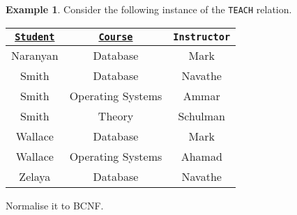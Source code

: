 \documentclass[a4paper, openany]{memoir}
\theoremstyle{definition}
\newtheorem{example}[subsection]{Example}
\begin{document}
    \begin{example}
        Consider the following instance of the \texttt{TEACH} relation.
        \begin{table}[H]
            \centering
            \begin{tabular}{|c|c|c|}
                \hline
                \texttt{\underline{Student}} & \texttt{\underline{Course}} & \texttt{Instructor} \\
                \hline
                Naranyan & Database & Mark \\
                Smith & Database & Navathe \\
                Smith & Operating Systems & Ammar \\
                Smith & Theory & Schulman \\
                Wallace & Database & Mark \\
                Wallace & Operating Systems & Ahamad \\
                Zelaya & Database & Navathe \\
                \hline
            \end{tabular}
        \end{table}
        Normalise it to BCNF.
    \end{example}
\end{document}
